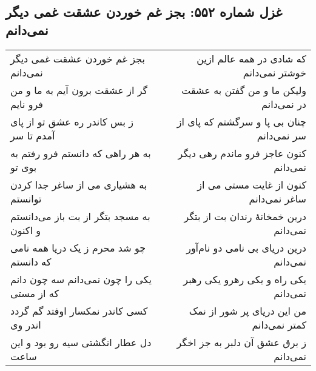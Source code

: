 \begin{center}
\section*{غزل شماره ۵۵۲: بجز غم خوردن عشقت غمی دیگر نمی‌دانم}
\label{sec:552}
\begin{longtable}{l p{0.5cm} r}
بجز غم خوردن عشقت غمی دیگر نمی‌دانم
&&
که شادی در همه عالم ازین خوشتر نمی‌دانم
\\
گر از عشقت برون آیم به ما و من فرو نایم
&&
ولیکن ما و من گفتن به عشقت در نمی‌دانم
\\
ز بس کاندر ره عشق تو از پای آمدم تا سر
&&
چنان بی پا و سرگشتم که پای از سر نمی‌دانم
\\
به هر راهی که دانستم فرو رفتم به بوی تو
&&
کنون عاجز فرو ماندم رهی دیگر نمی‌دانم
\\
به هشیاری می از ساغر جدا کردن توانستم
&&
کنون از غایت مستی می از ساغر نمی‌دانم
\\
به مسجد بتگر از بت باز می‌دانستم و اکنون
&&
درین خمخانهٔ رندان بت از بتگر نمی‌دانم
\\
چو شد محرم ز یک دریا همه نامی که دانستم
&&
درین دریای بی نامی دو نام‌آور نمی‌دانم
\\
یکی را چون نمی‌دانم سه چون دانم که از مستی
&&
یکی راه و یکی رهرو یکی رهبر نمی‌دانم
\\
کسی کاندر نمکسار اوفتد گم گردد اندر وی
&&
من این دریای پر شور از نمک کمتر نمی‌دانم
\\
دل عطار انگشتی سیه رو بود و این ساعت
&&
ز برق عشق آن دلبر به جز اخگر نمی‌دانم
\\
\end{longtable}
\end{center}
